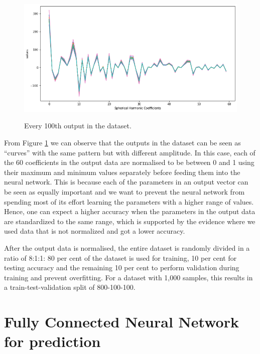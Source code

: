 \begin{figure}[H]
    \centering
    \caption{Every 100th output in the dataset.}
    \includegraphics[scale=0.5]{figures/geoid_images/Geoid_sample_output.png}
    \label{figure:geoid_output}
\end{figure}

From Figure \ref{figure:geoid_output} we can observe that the outputs in the dataset can be seen as ``curves'' with the same pattern but with different amplitude. In this case, each of the 60 coefficients in the output data are normalised to be between 0 and 1 using their maximum and minimum values separately before feeding them into the neural network. This is because each of the parameters in an output vector can be seen as equally important and we want to prevent the neural network from spending most of its effort learning the parameters with a higher range of values. Hence, one can expect a higher accuracy when the parameters in the output data are standardized to the same range, which is supported by the evidence where we used data that is not normalized and got a lower accuracy.

After the output data is normalised, the entire dataset is randomly divided in a ratio of 8:1:1: 80 per cent of the dataset is used for training, 10 per cent for testing accuracy and the remaining 10 per cent to perform validation during training and prevent overfitting. For a dataset with 1,000 samples, this results in a train-test-validation split of 800-100-100.

\section{Fully Connected Neural Network for prediction}

